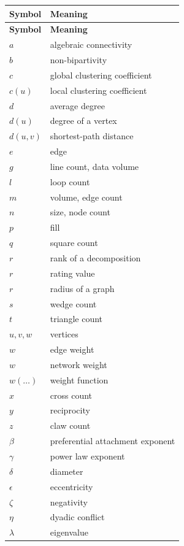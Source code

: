 \documentclass{article}
\begin{document}
\begin{longtable}{ll}
  \toprule
  \textbf{Symbol} & \textbf{Meaning} \\
  \midrule
  \endfirsthead
  \toprule
  \textbf{Symbol} & \textbf{Meaning} \\
  \midrule
  \endhead
  \bottomrule
  \endfoot
  \bottomrule
  \endlastfoot
  $a$ & algebraic connectivity \\
  $b$ & non-bipartivity \\
  $c$ & global clustering coefficient \\
  $c(u)$ & local clustering coefficient \\
  $d$ & average degree \\
  $d(u)$ & degree of a vertex \\
  $d(u,v)$ & shortest-path distance \\
  $e$ & edge \\
  $g$ & line count, data volume \\
  $l$ & loop count \\
  $m$ & volume, edge count \\
  $n$ & size, node count \\
  $p$ & fill \\
  $q$ & square count \\
  $r$ & rank of a decomposition \\
  $r$ & rating value \\
  $r$ & radius of a graph \\
  $s$ & wedge count \\
  $t$ & triangle count \\
  $u, v, w$ & vertices \\
  $w$ & edge weight \\ 
  $w$ & network weight \\
  $w(\ldots)$ & weight function \\
  $x$ & cross count \\
  $y$ & reciprocity \\
  $z$ & claw count \\
\midrule
  $\beta$  & preferential attachment exponent \\
  $\gamma$ & power law exponent \\
  $\delta$ & diameter \\
  $\epsilon$ & eccentricity \\
  $\zeta$ & negativity \\
  $\eta$ & dyadic conflict \\
  $\lambda$ & eigenvalue \\

\end{longtable}
\end{document}
